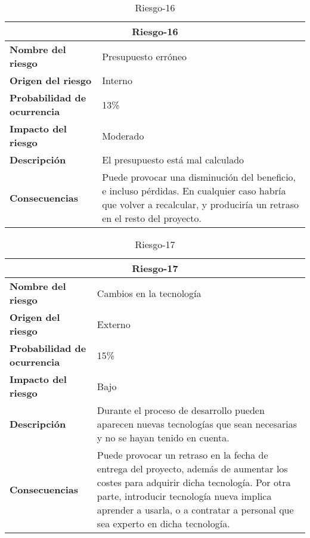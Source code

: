 \begin{table}[H]
\begin{center}
\begin{tabular}{p{} p{7cm}}
\multicolumn{2}{c}{\textbf{Riesgo-16} } \\
\hline \hline
\textbf{Nombre del riesgo} & Presupuesto erróneo \\
\hline
\textbf{Origen del riesgo} & Interno\\
\hline
\textbf{Probabilidad de ocurrencia} &  13\% \\
\hline
\textbf{Impacto del riesgo} & Moderado  \\
\hline
\textbf{Descripción} &   El presupuesto está mal calculado\\
\hline
\textbf{Consecuencias} &  Puede provocar una disminución del beneficio, e incluso pérdidas. En cualquier caso habría que volver a recalcular, y produciría un retraso en el resto del proyecto.  \\
\hline
\end{tabular}
\caption{Riesgo-16}
\label{tab:Riesgo-16}
\end{center}
\end{table}

\begin{table}[H]
\begin{center}
\begin{tabular}{p{} p{7cm}}
\multicolumn{2}{c}{\textbf{Riesgo-17} } \\
\hline \hline
\textbf{Nombre del riesgo} & Cambios en la tecnología \\
\hline
\textbf{Origen del riesgo} & Externo\\
\hline
\textbf{Probabilidad de ocurrencia} &  15\% \\
\hline
\textbf{Impacto del riesgo} &  Bajo \\
\hline
\textbf{Descripción} &   Durante el proceso de desarrollo pueden aparecen nuevas tecnologías que sean necesarias y no se hayan tenido en cuenta. \\
\hline
\textbf{Consecuencias} &  Puede provocar un retraso en la fecha de entrega del proyecto, además de aumentar los costes para adquirir dicha tecnología. Por otra parte, introducir tecnología nueva implica aprender a usarla, o a contratar a personal que sea experto en dicha tecnología. \\
\hline
\end{tabular}
\caption{Riesgo-17}
\label{tab:Riesgo-17}
\end{center}
\end{table}

